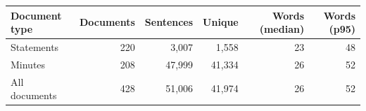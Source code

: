 \begin{tabular}{lrrrrr}
\hline
Document type & Documents & Sentences & Unique & Words (median) & Words (p95) \\
\hline
Statements & 220 & 3,007 & 1,558 & 23 & 48 \\
Minutes & 208 & 47,999 & 41,334 & 26 & 52 \\
All documents & 428 & 51,006 & 41,974 & 26 & 52 \\
\hline
\end{tabular}
